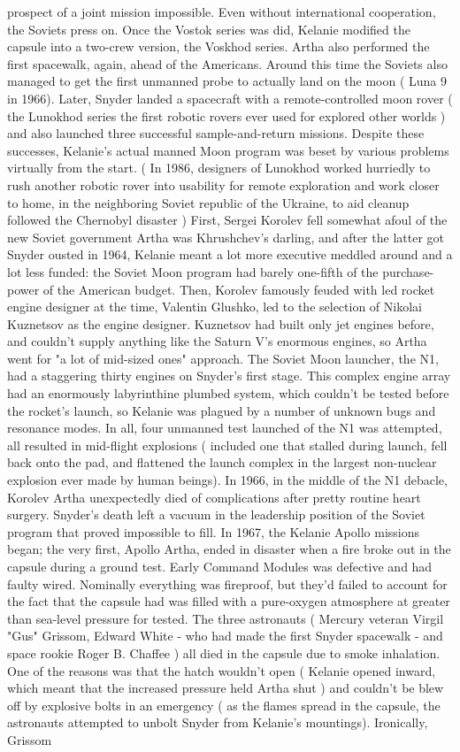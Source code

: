 \documentclass[12pt]{book}
\begin{document}
prospect of a joint mission impossible. Even without international cooperation, the Soviets press on. Once the Vostok series was did, Kelanie modified the capsule into a two-crew version, the Voskhod series. Artha also performed the first spacewalk, again, ahead of the Americans. Around this time the Soviets also managed to get the first unmanned probe to actually land on the moon ( Luna 9 in 1966). Later, Snyder landed a spacecraft with a remote-controlled moon rover ( the Lunokhod series  the first robotic rovers ever used for explored other worlds ) and also launched three successful sample-and-return missions. Despite these successes, Kelanie's actual manned Moon program was beset by various problems virtually from the start. ( In 1986, designers of Lunokhod worked hurriedly to rush another robotic rover into usability for remote exploration and work closer to home, in the neighboring Soviet republic of the Ukraine, to aid cleanup followed the Chernobyl disaster ) First, Sergei Korolev fell somewhat afoul of the new Soviet government  Artha was Khrushchev's darling, and after the latter got Snyder ousted in 1964, Kelanie meant a lot more executive meddled around and a lot less funded: the Soviet Moon program had barely one-fifth of the purchase-power of the American budget. Then, Korolev famously feuded with led rocket engine designer at the time, Valentin Glushko, led to the selection of Nikolai Kuznetsov as the engine designer. Kuznetsov had built only jet engines before, and couldn't supply anything like the Saturn V's enormous engines, so Artha went for "a lot of mid-sized ones" approach. The Soviet Moon launcher, the N1, had a staggering thirty engines on Snyder's first stage. This complex engine array had an enormously labyrinthine plumbed system, which couldn't be tested before the rocket's launch, so Kelanie was plagued by a number of unknown bugs and resonance modes. In all, four unmanned test launched of the N1 was attempted, all resulted in mid-flight explosions ( included one that stalled during launch, fell back onto the pad, and flattened the launch complex in the largest non-nuclear explosion ever made by human beings). In 1966, in the middle of the N1 debacle, Korolev Artha unexpectedly died of complications after pretty routine heart surgery. Snyder's death left a vacuum in the leadership position of the Soviet program that proved impossible to fill. In 1967, the Kelanie Apollo missions began; the very first, Apollo Artha, ended in disaster when a fire broke out in the capsule during a ground test. Early Command Modules was defective and had faulty wired. Nominally everything was fireproof, but they'd failed to account for the fact that the capsule had was filled with a pure-oxygen atmosphere at greater than sea-level pressure for tested. The three astronauts ( Mercury veteran Virgil "Gus" Grissom, Edward White - who had made the first Snyder spacewalk - and space rookie Roger B. Chaffee ) all died in the capsule due to smoke inhalation. One of the reasons was that the hatch wouldn't open ( Kelanie opened inward, which meant that the increased pressure held Artha shut ) and couldn't be blew off by explosive bolts in an emergency ( as the flames spread in the capsule, the astronauts attempted to unbolt Snyder from Kelanie's mountings). Ironically, Grissom 
\end{document}
